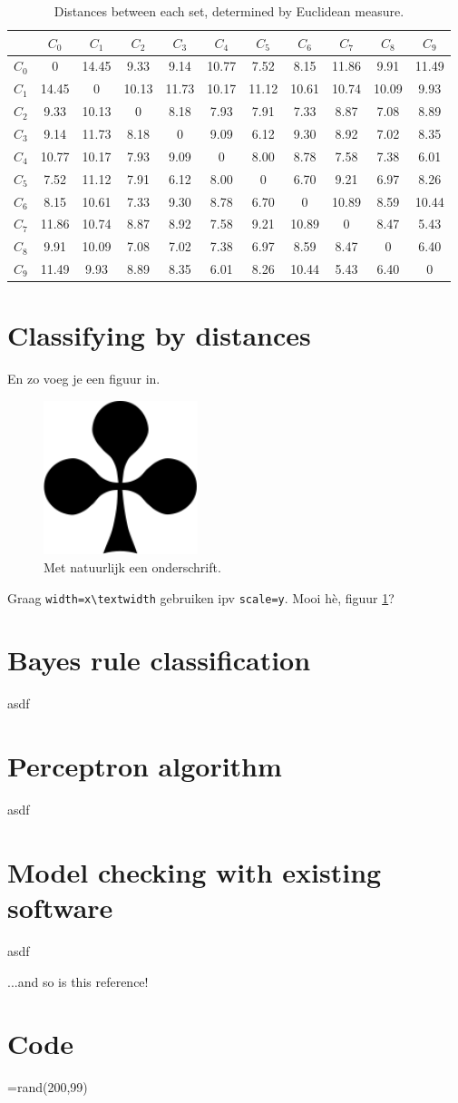 \documentclass[11pt]{article}
\begin{document}
\begin{table}
\centering
\begin{tabular}{c|cccccccccc}
&$C_0$&$C_1$&$C_2$&$C_3$&$C_4$&$C_5$&$C_6$&$C_7$&$C_8$&$C_9$\\\hline
$C_0$&0&14.45&9.33&9.14&10.77&7.52&8.15&11.86&9.91&11.49\\
$C_1$&14.45&0&10.13&11.73&10.17&11.12&10.61&10.74&10.09&9.93\\
$C_2$&9.33&10.13&0&8.18&7.93&7.91&7.33&8.87&7.08&8.89\\
$C_3$&9.14&11.73&8.18&0&9.09&6.12&9.30&8.92&7.02&8.35\\
$C_4$&10.77&10.17&7.93&9.09&0&8.00&8.78&7.58&7.38&6.01\\
$C_5$&7.52&11.12&7.91&6.12&8.00&0&6.70&9.21&6.97&8.26\\
$C_6$&8.15&10.61&7.33&9.30&8.78&6.70&0&10.89&8.59&10.44\\
$C_7$&11.86&10.74&8.87&8.92&7.58&9.21&10.89&0&8.47&5.43\\
$C_8$&9.91&10.09&7.08&7.02&7.38&6.97&8.59&8.47&0&6.40\\
$C_9$&11.49&9.93&8.89&8.35&6.01&8.26&10.44&5.43&6.40&0
\end{tabular}
\caption{Distances between each set, determined by Euclidean measure.}
\end{table}
\section{Classifying by distances}
En zo voeg je een figuur in.
\begin{figure}[!b]
\centering
\includegraphics[width=0.4\textwidth]{_Klaveren.png}
\caption{Met natuurlijk een onderschrift.}
\label{fig:klaveren}%
\end{figure}
Graag \verb|width=x\textwidth| gebruiken ipv \verb|scale=y|. Mooi hè, figuur \ref{fig:klaveren}?
\section{Bayes rule classification}
asdf
\section{Perceptron algorithm}
asdf
\section{Model checking with existing software}
asdf
\begin{thebibliography}{x}
...and so is this reference!
\end{thebibliography}
\appendix
\section{Code}
=rand(200,99)
\end{document}
